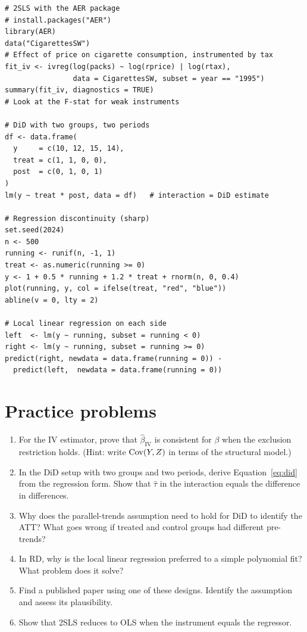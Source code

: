 \begin{codelab}
\begin{lstlisting}[language=Rlang]
# 2SLS with the AER package
# install.packages("AER")
library(AER)
data("CigarettesSW")
# Effect of price on cigarette consumption, instrumented by tax
fit_iv <- ivreg(log(packs) ~ log(rprice) | log(rtax),
                data = CigarettesSW, subset = year == "1995")
summary(fit_iv, diagnostics = TRUE)
# Look at the F-stat for weak instruments

# DiD with two groups, two periods
df <- data.frame(
  y     = c(10, 12, 15, 14),
  treat = c(1, 1, 0, 0),
  post  = c(0, 1, 0, 1)
)
lm(y ~ treat * post, data = df)   # interaction = DiD estimate

# Regression discontinuity (sharp)
set.seed(2024)
n <- 500
running <- runif(n, -1, 1)
treat <- as.numeric(running >= 0)
y <- 1 + 0.5 * running + 1.2 * treat + rnorm(n, 0, 0.4)
plot(running, y, col = ifelse(treat, "red", "blue"))
abline(v = 0, lty = 2)

# Local linear regression on each side
left  <- lm(y ~ running, subset = running < 0)
right <- lm(y ~ running, subset = running >= 0)
predict(right, newdata = data.frame(running = 0)) -
  predict(left,  newdata = data.frame(running = 0))
\end{lstlisting}
\end{codelab}

\section{Practice problems}

\begin{enumerate}
  \item For the IV estimator, prove that $\hat\beta_{\text{IV}}$ is consistent for $\beta$ when the exclusion restriction holds. (Hint: write $\operatorname{Cov}(Y, Z)$ in terms of the structural model.)
  \item In the DiD setup with two groups and two periods, derive Equation~\ref{eq:did} from the regression form. Show that $\hat\tau$ in the interaction equals the difference in differences.
  \item Why does the parallel-trends assumption need to hold for DiD to identify the ATT? What goes wrong if treated and control groups had different pre-trends?
  \item In RD, why is the local linear regression preferred to a simple polynomial fit? What problem does it solve?
  \item Find a published paper using one of these designs. Identify the assumption and assess its plausibility.
  \item Show that 2SLS reduces to OLS when the instrument equals the regressor.
\end{enumerate}

